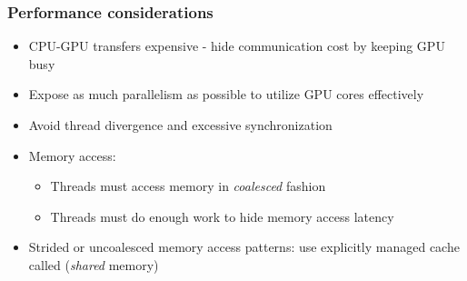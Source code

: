 \begin{frame}
\frametitle{Performance considerations}
\begin{itemize}
\item CPU-GPU transfers expensive -
    hide communication cost by keeping GPU busy
\item Expose as much parallelism as possible
    to utilize GPU cores effectively
\item Avoid thread divergence and excessive
    synchronization
\item Memory access:
    \begin{itemize}
        \item Threads must access memory in \emph{coalesced}
            fashion
        \item Threads must do enough work to hide
            memory access latency
    \end{itemize}
\item Strided or uncoalesced memory access patterns:
    use explicitly managed cache called (\emph{shared} memory)
\end{itemize}
\end{frame}

